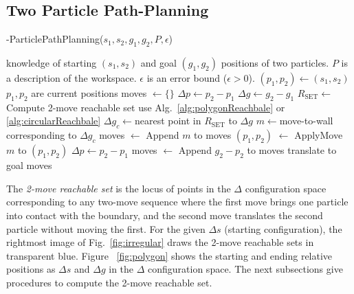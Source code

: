 \subsection{Two Particle Path-Planning}
\begin{algorithm}[htb]
\caption{ { -ParticlePathPlanning}($s_1,s_2,g_1,g_2,P,\epsilon$)}\label{alg:optimalAlg}
\begin{algorithmic}[1]
\Require knowledge of starting $(s_1,s_2)$ and goal $(g_1,g_2)$ positions of  two particles. 
 $P$ is a description of the workspace. $\epsilon$ is an error bound ($\epsilon>0$).
 \State $(p_1,p_2) \gets (s_1,s_2) $ \Comment $p_1 , p_2$ are current positions
\State  moves $\gets \{\}$
 \State $\Delta p \gets p_2-p_1$
 \State $\Delta g \gets g_2-g_1$
\State $R_{\textrm{SET}}\gets$  Compute 2-move reachable set  \Comment use Alg.~\ref{alg:polygonReachbale} or \ref{alg:circularReachbale}
\State $ \Delta g_c\gets $nearest point in $R_{\textrm{SET}}$ to $\Delta g$
\State $m \gets $move-to-wall corresponding to $\Delta g_c$
\State moves $\gets$ Append $m$ to moves
\State $(p_1, p_2)$ $\gets$ ApplyMove $m$ to $(p_1,p_2)$
 \State $\Delta p \gets p_2-p_1$
\EndWhile
\State moves $\gets$ Append $g_2-p_2$ to moves \Comment translate to goal
\State \Return moves
\end{algorithmic}
\end{algorithm}


  The \emph{2-move reachable set} is the locus of points in the $\Delta$ configuration space corresponding to any two-move sequence where the first move brings one particle into contact with the boundary, and the second move translates the second particle without moving the first.
 For the given $\Delta s$ (starting configuration), the rightmost image of Fig.~\ref{fig:irregular} draws the 2-move reachable sets  in transparent blue.
 Figure ~\ref{fig:polygon} shows the starting and ending relative positions as $\Delta s$ and $\Delta g$ in the $\Delta$ configuration space.  The next subsections give procedures to compute the 2-move reachable set.%
 

